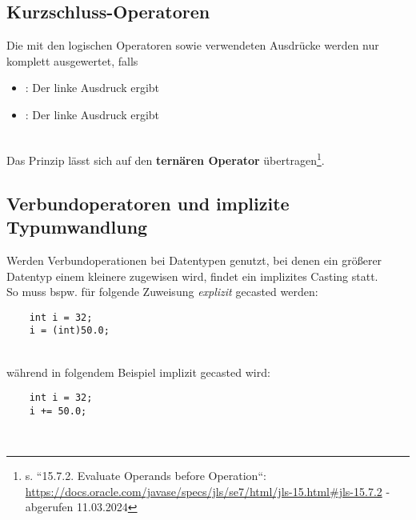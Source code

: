\subsection{Kurzschluss-Operatoren}
Die mit den logischen Operatoren \code{&&} sowie \code{||} verwendeten Ausdrücke werden nur komplett ausgewertet, falls

\begin{itemize}
    \item \code{&&}: Der linke Ausdruck  ergibt
    \item \code{||}: Der linke Ausdruck  ergibt
\end{itemize}\\

\noindent
Das Prinzip lässt sich auf den \textbf{ternären Operator}  übertragen\footnote{
s. ``15.7.2. Evaluate Operands before Operation``: \url{https://docs.oracle.com/javase/specs/jls/se7/html/jls-15.html#jls-15.7.2} - abgerufen 11.03.2024
}.


\subsection{Verbundoperatoren und implizite Typumwandlung}

Werden Verbundoperationen bei Datentypen genutzt, bei denen ein größerer Datentyp einem kleinere zugewisen wird, findet ein implizites Casting statt.\\

\noindent
So muss bspw. für folgende Zuweisung \textit{explizit} gecasted werden:

\begin{verbatim}
    int i = 32;
    i = (int)50.0;
\end{verbatim}\\

während in folgendem Beispiel implizit gecasted wird:

\begin{verbatim}
    int i = 32;
    i += 50.0;
\end{verbatim}\\
